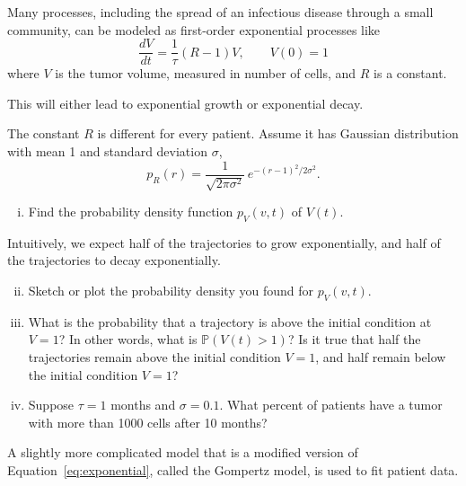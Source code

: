 \documentclass[12pt,letterpaper]{article}
\begin{document}



Many processes, including the spread of an infectious disease through a small community, can be modeled as first-order exponential processes like
\begin{equation}
\frac{dV}{dt} = \frac{1}{\tau}\left(R-1\right) V, \qquad V(0)=1 \label{eq:exponential}
\end{equation}
where $V$ is the tumor volume, measured in number of cells, and $R$ is a constant.

This will either lead to exponential growth or exponential decay.

The constant $R$ is different for every patient.
Assume it has Gaussian distribution with mean 1 and standard deviation $\sigma$,
\begin{equation*}
p_R(r) = \frac{1}{\sqrt{2\pi \sigma^2}}\, e^{-\left(r-1\right)^2/2\sigma^2}.
\end{equation*}

\begin{enumerate}[i. ]
\item Find the probability density function $p_V(v,t)$ of $V(t)$.
\end{enumerate}

Intuitively, we expect half of the trajectories to grow exponentially, and half of the trajectories to decay exponentially.

\begin{enumerate}[i. ]
\setcounter{enumi}{1}
\item Sketch or plot the probability density you found for $p_V(v,t)$.
\item What is the probability that a trajectory is above the initial condition at $V=1$? In other words, what is $\mathbb{P}(V(t)>1)$? Is it true that half the trajectories remain above the initial condition $V=1$, and half remain below the initial condition $V=1$? 
\item Suppose $\tau= 1$ months and $\sigma = 0.1$. What percent of patients have a tumor with more than 1000 cells after 10 months?
\end{enumerate}

A slightly more complicated model that is a modified version of Equation~\ref{eq:exponential}, called the Gompertz model, is used to fit patient data. 

\end{document}
